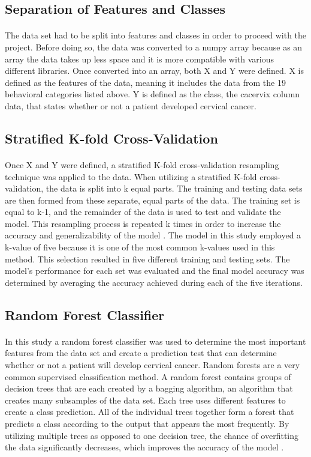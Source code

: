 \documentclass[10pt, oneside, twocolumn]{article}
\begin{document}
\subsection{Separation of Features and Classes}
\paragraph{}
The data set had to be split into features and classes in order to proceed with the project. Before doing so, the data was converted to a numpy array because as an array the data takes up less space and it is more compatible with various different libraries. Once converted into an array, both X and Y were defined. X is defined as the features of the data, meaning it includes the data from the 19 behavioral categories listed above. Y is defined as the class, the ca\textunderscore cervix column data, that states whether or not a patient developed cervical cancer.
\subsection{Stratified K-fold Cross-Validation}
\paragraph{}
Once X and Y were defined, a stratified K-fold cross-validation resampling technique was applied to the data. When utilizing a stratified K-fold cross-validation, the data is split into k equal parts. The training and testing data sets are then formed from these separate, equal parts of the data. The training set is equal to k-1, and the remainder of the data is used to test and validate the model. This resampling process is repeated k times in order to increase the accuracy and generalizability of the model \cite{Salod}. The model in this study employed a k-value of five because it is one of the most common k-values used in this method. This selection resulted in five different training and testing sets. The model’s performance for each set was evaluated and the final model accuracy was determined by averaging the accuracy achieved during each of the five iterations.  
\subsection{Random Forest Classifier}
\paragraph{}
In this study a random forest classifier was used to determine the most important features from the data set and create a prediction test that can determine whether or not a patient will develop cervical cancer. Random forests are a very common supervised classification method. A random forest contains groups of decision trees that are each created by a bagging algorithm, an algorithm that creates many subsamples of the data set. Each tree uses different features to create a class prediction.  All of the individual trees together form a forest that predicts a class according to the output that appears the most frequently. By utilizing multiple trees as opposed to one decision tree, the chance of overfitting the data significantly decreases, which improves the accuracy of the model \cite{Petkovic}.
\end{document}
